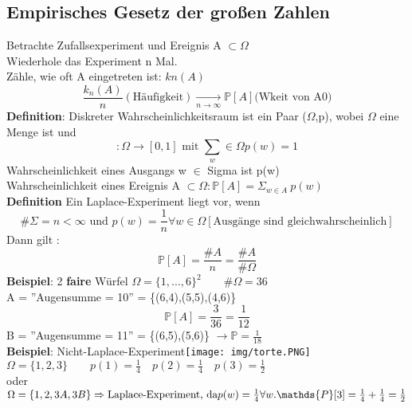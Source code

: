 \subsection{Empirisches Gesetz der großen Zahlen}
Betrachte Zufallsexperiment und Ereignis A $\subset \Omega$\\
Wiederhole das Experiment n Mal.\\
Zähle, wie oft A eingetreten ist: $kn(A)$ $$\frac{k_n(A)}{n} (\text{Häufigkeit}) \underset{n\rightarrow \infty}{\rightarrow} \mathds {P}[A] \text{(Wkeit von A0)}$$ 
\textbf{Definition}: Diskreter Wahrscheinlichkeitsraum ist ein Paar ($\Omega$,p), wobei $\Omega$ eine Menge ist und
$$:\Omega \rightarrow [0,1] \text{ mit } \sum_w\in \Omega p(w) = 1$$
Wahrscheinlichkeit eines Ausgangs w $\in$ Sigma ist p(w)\\
Wahrscheinlichkeit eines Ereignis A $\subset \Omega : \mathds {P}[A]=\Sigma_{w\in A}\:p(w)$\medskip\\
\textbf{Definition} Ein Laplace-Experiment liegt vor, wenn 
$$\#\Sigma = n < \infty \text{ und } p(w) = \frac{1}{n}\forall w \in \Omega[\text{Ausgänge sind gleichwahrscheinlich}]$$
Dann gilt : $$\mathds {P}[A]=\frac{\#A}{n}= \frac{\#A}{\#\Omega}$$
\textbf{Beispiel}: 2 \textbf{faire} Würfel $\Omega = \{1,...,6\}^2 \qquad \#\Omega = 36$\\
A = ''Augensumme  = 10'' = \{(6,4),(5,5),(4,6)\}
$$\mathds {P}[A] = \frac{3}{36}=\frac{1}{12}$$
B = ''Augensumme = 11'' = \{(6,5),(5,6)\} $\rightarrow \mathds {P}=\frac{1}{18}$\medskip\\
\textbf{Beispiel}: Nicht-Laplace-Experiment\texttt{[image: img/torte.PNG]}\\
$\Omega = \{1,2,3\} \qquad p(1) = \frac{1}{4} \quad p(2)=\frac{1}{4} \quad p(3) = \frac{1}{2}$\\oder
$\Omega = \{1,2,3A,3B\} \Rightarrow \text{Laplace-Experiment, da} \\ p(w) = \frac{1}{4} \forall w. \mathds {P}[3] = \frac{1}{4}+\frac{1}{4} = \frac{1}{2}$\medskip\\

